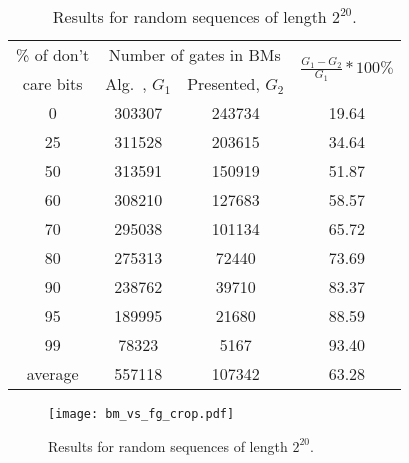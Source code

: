 \documentclass[10pt,conference]{IEEEtran}
\begin{document}
\begin{table}[t!]\centering\footnotesize
\begin{tabular}{|c|c|c|c|} \hline               
\% of  don't &  \multicolumn{2}{c|}{Number of gates in BMs} & \multirow{2}{*}{$\frac{G_1-G_2}{G_1}*100\%$} \\ \cline{2-3}
care bits & Alg.~\cite{Du11a}, $G_1$	& Presented, $G_2$ &    \\ \hline
0       &       303307  &       243734  &       19.64     \\
25      &       311528  &       203615  &       34.64     \\
50      &       313591  &       150919  &       51.87    \\
60      &       308210  &       127683  &       58.57     \\
70      &       295038  &       101134  &       65.72     \\
80      &       275313  &       72440   &       73.69     \\
90      &       238762  &       39710   &       83.37     \\
95      &       189995  &       21680   &       88.59      \\
99      &       78323   &       5167    &       93.40     \\  \hline
average & 557118 & 107342 & 63.28 \\ \hline
\end{tabular}
\caption{Results for random sequences of length $2^{20}$.}
\label{ta1}
\end{table}

\begin{figure}[t!]
\begin{center}
    \texttt{[image: bm\_vs\_fg\_crop.pdf]}
\caption{Results for random sequences of length $2^{20}$.}\label{ff}
\end{center}
\end{figure}
\end{document}
